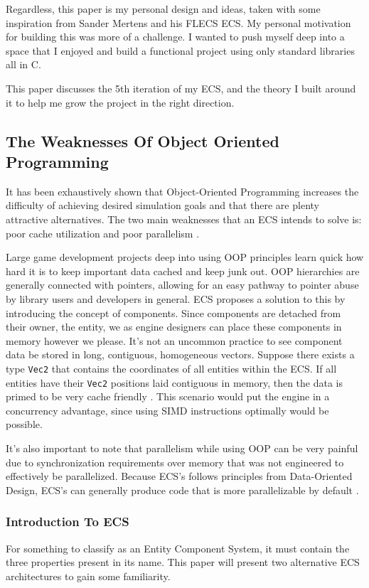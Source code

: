 Regardless, this paper is my personal design and ideas, taken with some inspiration from Sander Mertens and his FLECS ECS. My personal motivation for building this was more of a challenge. I wanted to push myself deep into a space that I enjoyed and build a functional project using only standard libraries all in C.

This paper discusses the 5th iteration of my ECS, and the theory I built around it to help me grow the project in the right direction.

\subsection{The Weaknesses Of Object Oriented Programming}

It has been exhaustively shown that Object-Oriented Programming increases the difficulty of achieving desired simulation goals and that there are plenty attractive alternatives. The two main weaknesses that an ECS intends to solve is: poor cache utilization and poor parallelism \cite{RomeoPHD}.

Large game development projects deep into using OOP principles learn quick how hard it is to keep important data cached and keep junk out. OOP hierarchies are generally connected with pointers, allowing for an easy pathway to pointer abuse by library users and developers in general. ECS proposes a solution to this by introducing the concept of components. Since components are detached from their owner, the entity, we as engine designers can place these components in memory however we please. It's not an uncommon practice to see component data be stored in long, contiguous, homogeneous vectors. Suppose there exists a type \texttt{Vec2} that contains the coordinates of all entities within the ECS. If all entities have their \texttt{Vec2} positions laid contiguous in memory, then the data is primed to be very cache friendly \cite{Wiebusch2012}\cite{SanderMertensECS}. This scenario would put the engine in a concurrency advantage, since using SIMD instructions optimally would be possible. 

It's also important to note that parallelism while using OOP can be very painful due to synchronization requirements over memory that was not engineered to effectively be parallelized. Because ECS's follows principles from Data-Oriented Design, ECS's can generally produce code that is more parallelizable by default \cite{RomeoPHD}.

\subsubsection{Introduction To ECS}
For something to classify as an Entity Component System, it must contain the three properties present in its name. This paper will present two alternative ECS architectures to gain some familiarity. 

